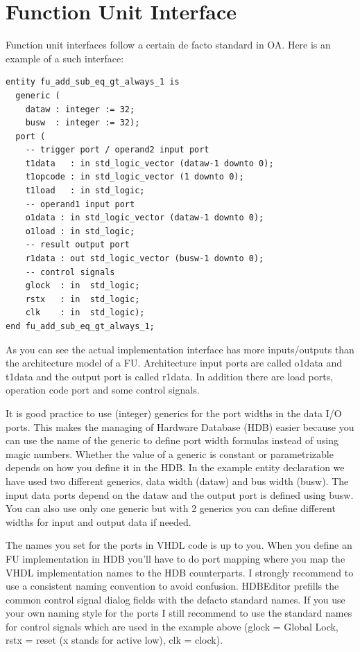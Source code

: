 \documentclass[a4paper,twoside]{tceusermanual}
\begin{document}


\section{Function Unit Interface}

Function unit interfaces follow a certain de facto standard in OA. Here is
an example of a such interface:

\begin{verbatim}
entity fu_add_sub_eq_gt_always_1 is
  generic (
    dataw : integer := 32;
    busw  : integer := 32);
  port (
    -- trigger port / operand2 input port
    t1data   : in std_logic_vector (dataw-1 downto 0);
    t1opcode : in std_logic_vector (1 downto 0);
    t1load   : in std_logic;
    -- operand1 input port
    o1data : in std_logic_vector (dataw-1 downto 0);
    o1load : in std_logic;
    -- result output port
    r1data : out std_logic_vector (busw-1 downto 0);
    -- control signals
    glock  : in  std_logic;
    rstx   : in  std_logic;
    clk    : in  std_logic);
end fu_add_sub_eq_gt_always_1;
\end{verbatim}

As you can see the actual implementation interface has more inputs/outputs
than the architecture model of a FU. Architecture input ports are
called o1data and t1data and the output port is called r1data. In addition
there are load ports, operation code port and some control signals.

It is good practice to use (integer) generics for the port widths in the data
I/O ports. This makes the managing of Hardware Database (HDB) easier because
you can use the name of the generic to define port width formulas instead of
using magic numbers. Whether the value of a generic is constant or
parametrizable depends on how you define it in the HDB. In the example
entity declaration we have used two different generics, data width (dataw)
and bus width (busw). The input data ports depend on the dataw and the
output port is defined using busw. You can also use only one generic but
with 2 generics you can define different widths for input and output data if
needed.

The names you set for the ports in VHDL code is up to you. When you define
an FU implementation in HDB you'll have to do port mapping where you map the
VHDL implementation names to the HDB counterparts. I strongly recommend to
use a consistent naming convention to avoid confusion. HDBEditor prefills 
the common control signal dialog fields with the defacto standard
names. If you use your own naming style for the ports I still recommend to
use the standard names for control signals which are used in the example
above (glock = Global Lock, rstx = reset (x stands for active low), clk =
clock).
\end{document}
